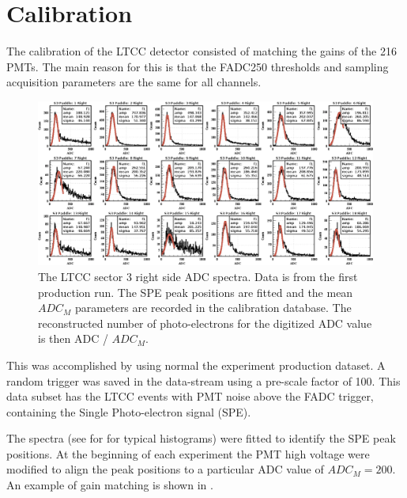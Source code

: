 \section{Calibration}

The calibration of the LTCC detector consisted of matching the gains of the 216 PMTs.
The main reason for this is that the FADC250 thresholds and sampling acquisition parameters are the same for all channels.

\begin{figure}
	\centering
	\includegraphics[width=1.99\columnwidth,keepaspectratio]{img/spe.png}
	\caption{The LTCC sector 3 right side ADC spectra. Data is from the first production run. The SPE peak positions are fitted and the mean $ADC_M$
            parameters are recorded in the calibration database. The reconstructed number of photo-electrons for the digitized ADC value is then ADC / $ADC_M$.}
	\label{fig:speCalibration}
\end{figure}

This was accomplished by using normal the experiment production dataset.
A random trigger was saved in the data-stream using a pre-scale factor of 100.
This data subset has the LTCC events with PMT noise above the FADC trigger, containing the Single Photo-electron signal (SPE).

The spectra (see for  for typical histograms) were fitted to identify the SPE peak positions.
At the beginning of each experiment the PMT high voltage were modified to align the peak positions
to a particular ADC value of $ADC_M = 200$. An example of gain matching is shown in .



